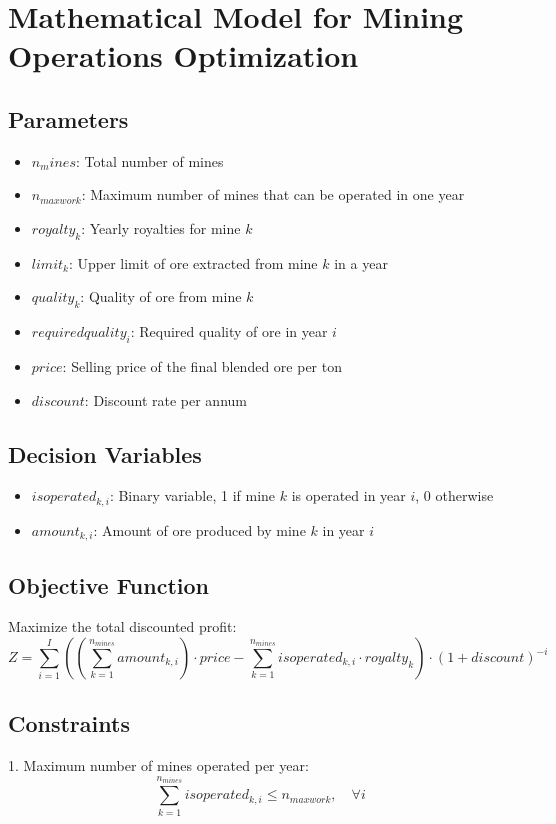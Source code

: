 \documentclass{article}
\begin{document}
\section*{Mathematical Model for Mining Operations Optimization}

\subsection*{Parameters}
\begin{itemize}
    \item $n_mines$: Total number of mines
    \item $n_{maxwork}$: Maximum number of mines that can be operated in one year
    \item $royalty_k$: Yearly royalties for mine $k$
    \item $limit_k$: Upper limit of ore extracted from mine $k$ in a year
    \item $quality_k$: Quality of ore from mine $k$
    \item $requiredquality_i$: Required quality of ore in year $i$
    \item $price$: Selling price of the final blended ore per ton
    \item $discount$: Discount rate per annum
\end{itemize}

\subsection*{Decision Variables}
\begin{itemize}
    \item $isoperated_{k,i}$: Binary variable, 1 if mine $k$ is operated in year $i$, 0 otherwise
    \item $amount_{k,i}$: Amount of ore produced by mine $k$ in year $i$
\end{itemize}

\subsection*{Objective Function}
Maximize the total discounted profit:
\[
Z = \sum_{i=1}^{I} \left( \left( \sum_{k=1}^{n_{mines}} amount_{k,i} \right) \cdot price - \sum_{k=1}^{n_{mines}} isoperated_{k,i} \cdot royalty_k \right) \cdot (1 + discount)^{-i}
\]

\subsection*{Constraints}
1. Maximum number of mines operated per year:
\[
\sum_{k=1}^{n_{mines}} isoperated_{k,i} \leq n_{maxwork}, \quad \forall i
\]
\end{document}
